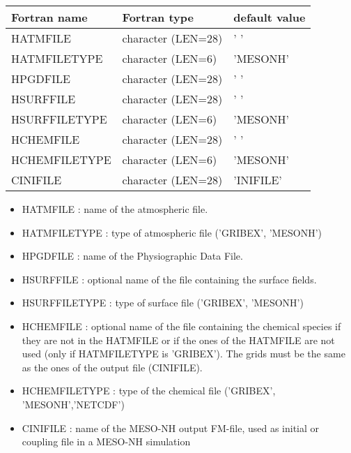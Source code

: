 \begin{center}
\begin{tabular} {|l|l|l|}
\hline
Fortran name & Fortran type & default value\\
\hline
\hline
HATMFILE      & character (LEN=28) & ' '           \\
HATMFILETYPE  & character (LEN=6)  & 'MESONH'      \\
HPGDFILE      & character (LEN=28) & ' '           \\
HSURFFILE     & character (LEN=28) & ' '           \\
HSURFFILETYPE & character (LEN=6)  & 'MESONH'      \\
HCHEMFILE     & character (LEN=28) & ' '           \\
HCHEMFILETYPE & character (LEN=6)  & 'MESONH'      \\
CINIFILE      & character (LEN=28) & 'INIFILE'     \\
\hline
\end{tabular}
\end{center}

\begin{itemize}
\item HATMFILE : name of the atmospheric file.
\item HATMFILETYPE : type of  atmospheric file ('GRIBEX', 'MESONH')
\item HPGDFILE : name of the Physiographic Data File.
\item HSURFFILE : optional name of the file containing the surface fields.
\item HSURFFILETYPE : type of surface file ('GRIBEX', 'MESONH')
\item HCHEMFILE : optional name of the file containing
the chemical species if they are not in the HATMFILE or if the ones of the
HATMFILE are not used (only if HATMFILETYPE is 'GRIBEX'). The grids must
be the same as the ones of the output file (CINIFILE).
\item HCHEMFILETYPE : type of the chemical file ('GRIBEX', 'MESONH','NETCDF')
\item CINIFILE : name of the MESO-NH output FM-file, used as initial
or coupling file in a MESO-NH simulation
\end{itemize}
\newpage
